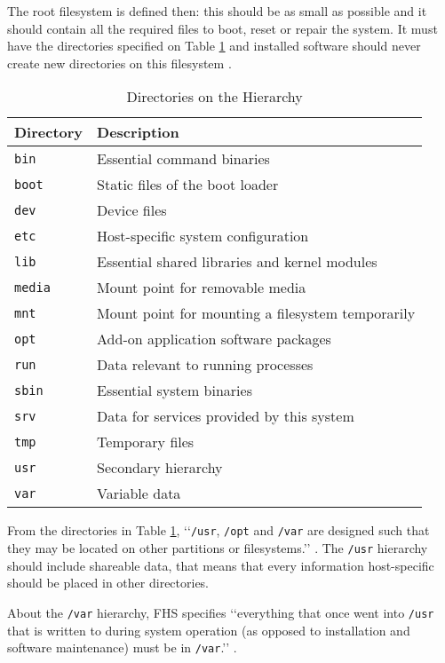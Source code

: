 The root filesystem is defined then: this should be as small as possible and it should contain all the required files to boot, reset or repair the system. It must have the directories specified on Table \ref{tab:directories} and installed software should never create new directories on this filesystem \cite{allbery2015filesystem}.


\begin{table}[h!]
\centering
\caption{Directories on the Hierarchy \cite{allbery2015filesystem}}
\label{tab:directories}
\begin{tabular}{ll}
\toprule
\textbf{Directory} & \textbf{Description} \\
\midrule
\texttt{bin} & Essential command binaries \\
\texttt{boot} & Static files of the boot loader \\
\texttt{dev} & Device files \\
\texttt{etc} & Host-specific system configuration \\
\texttt{lib} & Essential shared libraries and kernel modules \\
\texttt{media} & Mount point for removable media \\
\texttt{mnt} & Mount point for mounting a filesystem temporarily \\
\texttt{opt} & Add-on application software packages \\
\texttt{run} & Data relevant to running processes \\
\texttt{sbin} & Essential system binaries \\
\texttt{srv} & Data for services provided by this system \\
\texttt{tmp} & Temporary files \\
\texttt{usr} & Secondary hierarchy \\
\texttt{var} & Variable data \\
\bottomrule
\end{tabular}
\end{table}


From the directories in Table \ref{tab:directories}, \lq\lq \texttt{/usr}, \texttt{/opt} and \texttt{/var} are designed such that they may be located on other partitions or filesystems.\rq\rq{} \cite[p. 3]{allbery2015filesystem}. The \texttt{/usr} hierarchy should include shareable data, that means that every information host-specific should be placed in other directories.

About the \texttt{/var} hierarchy, FHS specifies \lq\lq everything that once went into \texttt{/usr} that is written to during system operation (as opposed to installation and software maintenance) must be in \texttt{/var}.\rq\rq{}  \cite[p. 30]{allbery2015filesystem}.



